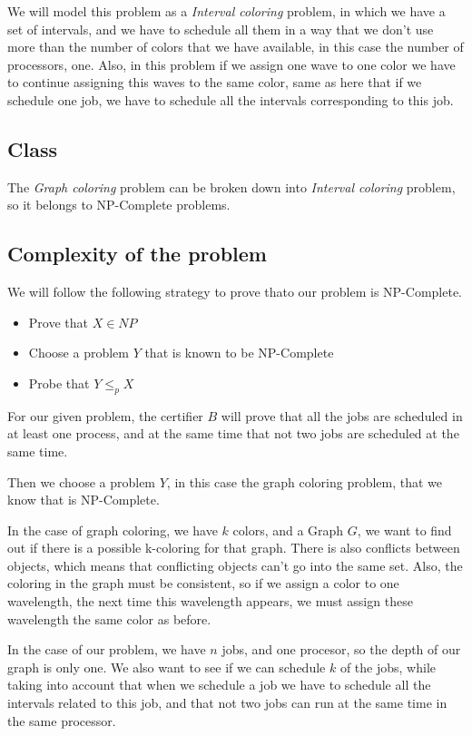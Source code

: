 \documentclass{article}
\begin{document}
We will model this problem as a \textit{Interval coloring} problem, in which we have a set of intervals, and we have to schedule all them in a way that we don't use more than the number of colors that we have available, in this case the number of processors, one. Also, in this problem if we assign one wave to one color we have to continue assigning this waves to the same color, same as here that if we schedule one job, we have to schedule all the intervals corresponding to this job.

\subsection*{Class}

The \textit{Graph coloring} problem can be broken down into \textit{Interval coloring} problem, so it belongs to NP-Complete problems.

\subsection*{Complexity of the problem}

We will follow the following strategy to prove thato our problem is NP-Complete.

\begin{itemize}
 \item Prove that $X\in NP$
 \item Choose a problem $Y$ that is known to be NP-Complete
 \item Probe that $Y\leq_p X$
\end{itemize}

For our given problem, the certifier $B$ will prove that all the jobs are scheduled in at least one process, and at the same time that not two jobs are scheduled at the same time.

Then we choose a problem $Y$, in this case the graph coloring problem, that we know that is NP-Complete.

In the case of graph coloring, we have $k$ colors, and a Graph $G$, we want to find out if there is a possible k-coloring for that graph. There is also conflicts between objects, which means that conflicting objects can't go into the same set. Also, the coloring in the graph must be consistent, so if we assign a color to one wavelength, the next time this wavelength appears, we must assign these wavelength the same color as before.

In the case of our problem, we have $n$ jobs, and one procesor, so the depth of our graph is only one. We also want to see if we can schedule $k$ of the jobs, while taking into account that when we schedule a job we have to schedule all the intervals related to this job, and that not two jobs can run at the same time in the same processor.
\end{document}
